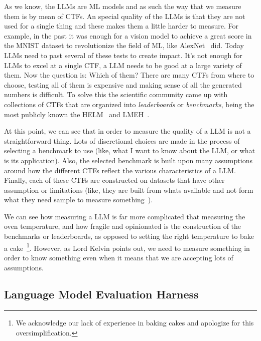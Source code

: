 As we know, the \glspl{LLM} are \gls{ML} models and as such the way that we measure them is by mean of \glspl{CTF}. An special quality of the \glspl{LLM} is that they are not used for a single thing and these makes them a little harder to measure. For example, in the past it was enough for a vision model to achieve a great score in the MNIST dataset to revolutionize the field of \gls{ML}, like AlexNet~\cite{krizhevsky2012imagenet} did. Today \glspl{LLM} need to past several of these tests to create impact. It's not enough for \glspl{LLM} to excel at a single \gls{CTF}, a \gls{LLM} needs to be good at a large variety of them. Now the question is: Which of them? There are many \glspl{CTF} from where to choose, testing all of them is expensive and making sense of all the generated numbers is difficult. To solve this the scientific community came up with collections of \glspl{CTF} that are organized into \emph{leaderboards} or \emph{benchmarks}, being the most publicly known the \gls{HELM}~\cite{liang_holistic_2023} and \gls{LMEH}~\cite{eval-harness}.

At this point, we can see that in order to measure the quality of a \gls{LLM} is not a straightforward thing. Lots of discretional choices are made in the process of selecting a benchmark to use (like, what I want to know about the \gls{LLM}, or what is its application). Also, the selected benchmark is built upon many assumptions around how the different \glspl{CTF} reflect the various characteristics of a \gls{LLM}. Finally, each of these \glspl{CTF} are constructed on datasets that have other assumption or limitations (like, they are built from whats available and not form what they need sample to measure something~\cite{raji2021ai}).

We can see how measuring a \gls{LLM} is far more complicated that measuring the oven temperature, and how fragile and opinionated is the construction of the benchmarks or leaderboards, as opposed to setting the right temperature to bake a cake~\footnote{We acknowledge our lack of experience in baking cakes and apologize for this oversimplification.}. However, as Lord Kelvin points out, we need to measure something in order to know something even when it means that we are accepting lots of assumptions.



\subsection{Language Model Evaluation Harness}

